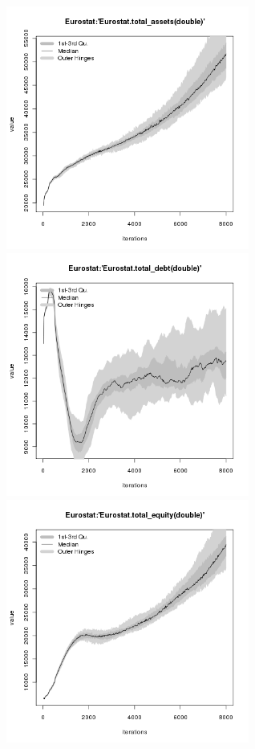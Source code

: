\begin{figure}[H!]
\centering\leavevmode
\begin{minipage}{17cm}
\centering\leavevmode
\includegraphics[width=8cm]{./benchmark_plots/Eurostat-total_assets.png}
\includegraphics[width=8cm]{./benchmark_plots/Eurostat-total_debt.png}\\
\includegraphics[width=8cm]{./benchmark_plots/Eurostat-total_equity.png}

\end{minipage}
\end{figure}
